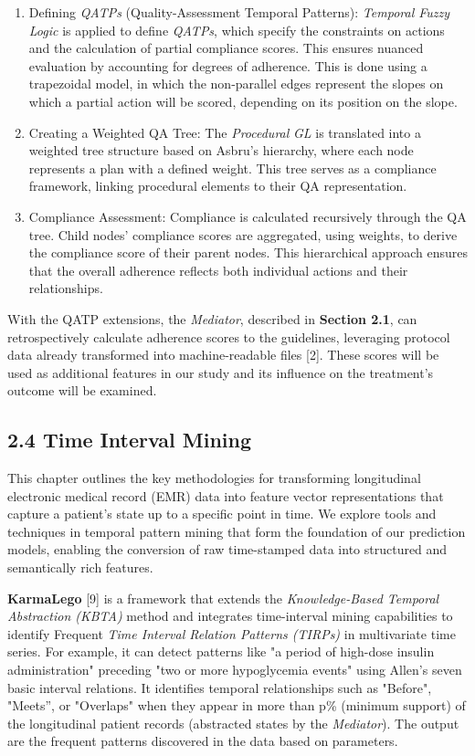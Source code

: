 \documentclass[
]{article}
\begin{document}
\begin{enumerate}
\def\labelenumi{\arabic{enumi}.}
\setcounter{enumi}{1}
\item
  Defining \emph{QATPs} (Quality-Assessment Temporal Patterns):
  \emph{Temporal Fuzzy Logic} is applied to define \emph{QATPs}, which
  specify the constraints on actions and the calculation of partial
  compliance scores. This ensures nuanced evaluation by accounting for
  degrees of adherence. This is done using a trapezoidal model, in which
  the non-parallel edges represent the slopes on which a partial action
  will be scored, depending on its position on the slope.
\item
  Creating a Weighted QA Tree: The \emph{Procedural} \emph{GL} is
  translated into a weighted tree structure based on Asbru's hierarchy,
  where each node represents a plan with a defined weight. This tree
  serves as a compliance framework, linking procedural elements to their
  QA representation.
\item
  Compliance Assessment: Compliance is calculated recursively through
  the QA tree. Child nodes' compliance scores are aggregated, using
  weights, to derive the compliance score of their parent nodes. This
  hierarchical approach ensures that the overall adherence reflects both
  individual actions and their relationships.
\end{enumerate}

With the QATP extensions, the \emph{Mediator}, described in
\textbf{Section 2.1}, can retrospectively calculate adherence scores to
the guidelines, leveraging protocol data already transformed into
machine-readable files {[}2{]}. These scores will be used as additional
features in our study and its influence on the treatment's outcome will
be examined.

\subsection{2.4 Time Interval Mining}\label{time-interval-mining}

This chapter outlines the key methodologies for transforming
longitudinal electronic medical record (EMR) data into feature vector
representations that capture a patient's state up to a specific point in
time. We explore tools and techniques in temporal pattern mining that
form the foundation of our prediction models, enabling the conversion of
raw time-stamped data into structured and semantically rich features.

\textbf{KarmaLego} {[}9{]} is a framework that extends the
\emph{Knowledge-Based Temporal Abstraction (KBTA)} method and integrates
time-interval mining capabilities to identify Frequent \emph{Time
Interval Relation Patterns (TIRPs)} in multivariate time series. For
example, it can detect patterns like "a period of high-dose insulin
administration" preceding "two or more hypoglycemia events" using
Allen's seven basic interval relations. It identifies temporal
relationships such as "Before", "Meets'', or "Overlaps" when they appear
in more than p\% (minimum support) of the longitudinal patient records
(abstracted states by the \emph{Mediator}). The output are the frequent
patterns discovered in the data based on parameters.
\end{document}
